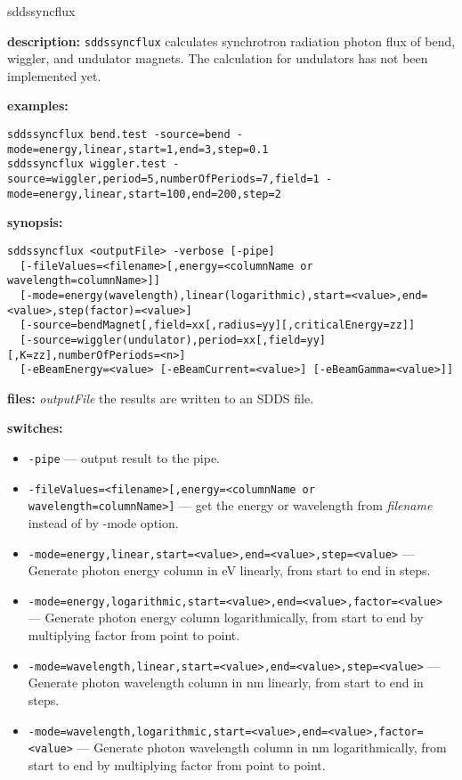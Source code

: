 \begin{sddsprog}{sddssyncflux}
  \item \textbf{description:}
    \verb|sddssyncflux| calculates synchrotron radiation photon flux of bend, wiggler, and undulator magnets. The calculation for undulators has not been implemented yet.
  \item \textbf{examples:}
    \begin{verbatim}
sddssyncflux bend.test -source=bend -mode=energy,linear,start=1,end=3,step=0.1
sddssyncflux wiggler.test -source=wiggler,period=5,numberOfPeriods=7,field=1 -mode=energy,linear,start=100,end=200,step=2
    \end{verbatim}
  \item \textbf{synopsis:}
    \begin{verbatim}
sddssyncflux <outputFile> -verbose [-pipe]
  [-fileValues=<filename>[,energy=<columnName or wavelength=columnName>]]
  [-mode=energy(wavelength),linear(logarithmic),start=<value>,end=<value>,step(factor)=<value>]
  [-source=bendMagnet[,field=xx[,radius=yy][,criticalEnergy=zz]]
  [-source=wiggler(undulator),period=xx[,field=yy][,K=zz],numberOfPeriods=<n>]
  [-eBeamEnergy=<value> [-eBeamCurrent=<value>] [-eBeamGamma=<value>]]
    \end{verbatim}
  \item \textbf{files:}
    \emph{outputFile} the results are written to an SDDS file.
  \item \textbf{switches:}
    \begin{itemize}
      \item \verb|-pipe| --- output result to the pipe.
      \item \verb|-fileValues=<filename>[,energy=<columnName or wavelength=columnName>]| --- get the energy or wavelength from \emph{filename} instead of by -mode option.
      \item \verb|-mode=energy,linear,start=<value>,end=<value>,step=<value>| --- Generate photon energy column in eV linearly, from start to end in steps.
      \item \verb|-mode=energy,logarithmic,start=<value>,end=<value>,factor=<value>| --- Generate photon energy column logarithmically, from start to end by multiplying factor from point to point.
      \item \verb|-mode=wavelength,linear,start=<value>,end=<value>,step=<value>| --- Generate photon wavelength column in nm linearly, from start to end in steps.
      \item \verb|-mode=wavelength,logarithmic,start=<value>,end=<value>,factor=<value>| --- Generate photon wavelength column in nm logarithmically, from start to end by multiplying factor from point to point.

\end{itemize}
\end{sddsprog}
